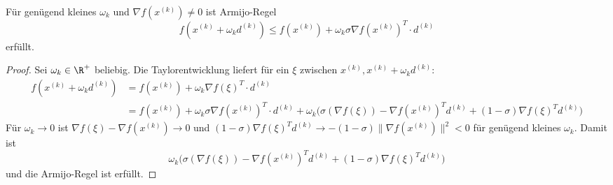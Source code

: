 \documentclass[11pt]{scrbook}
\begin{document}
\begin{lem} \label{4.7}
	Für genügend kleines $\omega_k$ und $\nabla f(x^{(k)}) \neq 0$ ist Armijo-Regel
	\[
		f(x^{(k)} + \omega_k d^{(k)}) \le f(x^{(k)}) + \omega_k \sigma \nabla f(x^{(k)})^T \cdot d^{(k)}
	\]
	erfüllt.
	\begin{proof}
		Sei $\omega_k \in \R^+$ beliebig.
		Die Taylorentwicklung liefert für ein $\xi$ zwischen $x^{(k)}, x^{(k)} + \omega_k d^{(k)}$:
		\begin{align*}
			f(x^{(k)}+ \omega_k d^{(k)}) &= f(x^{(k)}) + \omega_k \nabla f(\xi)^T \cdot d^{(k)} \\
			&= f(x^{(k)}) + \omega_k \sigma \nabla f(x^{(k)})^T \cdot d^{(k)}
			+ \omega_k \big(\sigma (\nabla f(\xi)) - \nabla f(x^{(k)})^T d^{(k)} + (1-\sigma)\nabla f(\xi)^T d^{(k)} \Big)
		\end{align*}
		Für $\omega_k \to 0$ ist $\nabla f(\xi) - \nabla f(x^{(k)}) \to 0$ und $(1-\sigma) \nabla f(\xi)^T d^{(k)} \to -(1-\sigma)\|\nabla f(x^{(k)})\|^2 < 0$ für genügend kleines $\omega_k$.
		Damit ist
		\[
			\omega_k \big(\sigma (\nabla f(\xi)) - \nabla f(x^{(k)})^T d^{(k)} + (1-\sigma)\nabla f(\xi)^T d^{(k)} \Big)
		\]
		und die Armijo-Regel ist erfüllt.
	\end{proof}
\end{lem}
\end{document}
